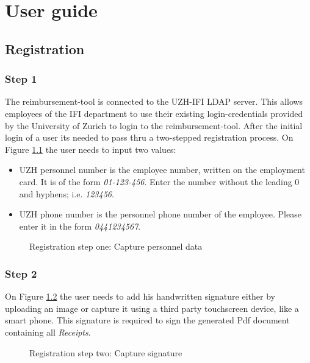     \chapter{User guide}

\section{Registration}
\label{sec:registration}

\subsection{Step 1}
The reimbursement-tool is connected to the UZH-IFI LDAP server. This allows employees of the IFI department to use their existing login-credentials provided by the University of Zurich to login to the reimbursement-tool.\newline
After the initial login of a user its needed to pass thru a two-stepped registration process. On Figure \ref{fig:registration-step01} the user needs to input two values:
\begin{itemize}
    \item UZH personnel number is the employee number, written on the employment card. It is of the form \textit{01-123-456}. Enter the number without the leading 0 and hyphens; i.e. \textit{123456}.
    \item UZH phone number is the personnel phone number of the employee. Please enter it in the form \textit{0441234567}.
\end{itemize}


\begin{figure}[H]
    \centering
    \caption{Registration step one: Capture personnel data}
    \label{fig:registration-step01}
\end{figure}

\subsection{Step 2}
On Figure \ref{fig:registration-step02} the user needs to add his handwritten signature either by uploading an image or capture it using a third party touchscreen device, like a smart phone. This signature is required to sign the generated Pdf document containing all \textit{Receipts}.

\begin{figure}[H]
    \centering
    \caption{Registration step two: Capture signature}
    \label{fig:registration-step02}
\end{figure}

